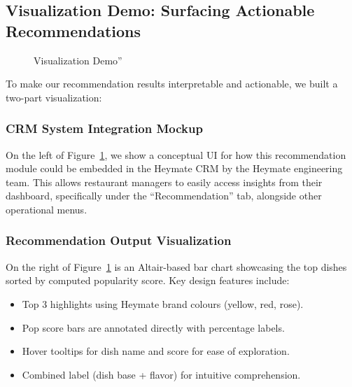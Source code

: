 \documentclass[
  11pt,
  a4paper,
  DIV=11,
  numbers=noendperiod]{scrartcl}
\providecommand{\tightlist}{%
  \setlength{\itemsep}{0pt}\setlength{\parskip}{0pt}}\usepackage{longtable,booktabs,array}
\begin{document}
\subsection{Visualization Demo: Surfacing Actionable
Recommendations}\label{visualization-demo-surfacing-actionable-recommendations}

\begin{figure}

\caption{\label{fig-viz-demo}Visualization Demo''}


\end{figure}%

To make our recommendation results interpretable and actionable, we
built a two-part visualization:

\subsubsection{CRM System Integration
Mockup}\label{crm-system-integration-mockup}

On the left of Figure~\ref{fig-viz-demo}, we show a conceptual UI for
how this recommendation module could be embedded in the Heymate CRM by
the Heymate engineering team. This allows restaurant managers to easily
access insights from their dashboard, specifically under the
``Recommendation'' tab, alongside other operational menus.

\subsubsection{Recommendation Output
Visualization}\label{recommendation-output-visualization}

On the right of Figure~\ref{fig-viz-demo} is an Altair-based bar chart
showcasing the top dishes sorted by computed popularity score. Key
design features include:

\begin{itemize}
\tightlist
\item
  Top 3 highlights using Heymate brand colours (yellow, red, rose).
\item
  Pop score bars are annotated directly with percentage labels.
\item
  Hover tooltips for dish name and score for ease of exploration.
\item
  Combined label (dish base + flavor) for intuitive comprehension.
\end{itemize}
\end{document}
